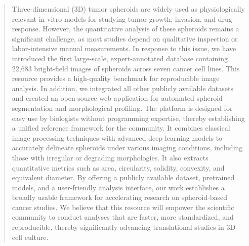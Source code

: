 \documentclass[preprint,12pt]{elsarticle}
\newcommand{\dsHQ}{SpheroHQ}
\newcommand{\dsMix}{SpheroMix}
\begin{document}
\begin{frontmatter}
\begin{abstract}
Three-dimensional (3D) tumor spheroids are widely used as physiologically relevant in vitro models for studying tumor growth, invasion, and drug response. However, the quantitative analysis of these spheroids remains a significant challenge, as most studies depend on qualitative inspection or labor-intensive manual measurements. In response to this issue, we have introduced the first large-scale, expert-annotated database containing 22,683 bright-field images of spheroids across seven cancer cell lines. This resource provides a high-quality benchmark for reproducible image analysis. In addition, we integrated all other publicly available datasets and created an open-source web application for automated spheroid segmentation and morphological profiling. The platform is designed for easy use by biologists without programming expertise, thereby establishing a unified reference framework for the community. It combines classical image processing techniques with advanced deep learning models to accurately delineate spheroids under various imaging conditions, including those with irregular or degrading morphologies. It also extracts quantitative metrics such as area, circularity, solidity, convexity, and equivalent diameter. By offering a publicly available dataset, pretrained models, and a user-friendly analysis interface, our work establishes a broadly usable framework for accelerating research on spheroid-based cancer studies. We believe that this resource will empower the scientific community to conduct analyses that are faster, more standardized, and reproducible, thereby significantly advancing translational studies in 3D cell culture.



\end{abstract}
\end{frontmatter}
\end{document}
